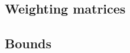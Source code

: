 \subsection{Weighting matrices}
\label{sec:Weighting matrices:TKC}
%
%
%
%
%
%
\subsection{Bounds}
\label{sec:Bounds:TKC}
%
%

\endinput

Any text after an \endinput is ignored.
You could put scraps here or things in progress.
